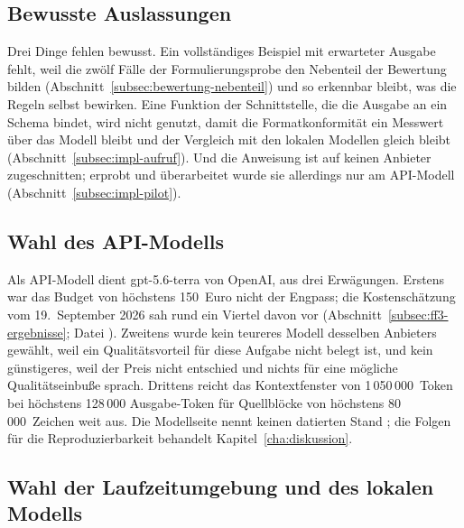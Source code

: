 \documentclass[11pt,a4paper]{report}
\begin{document}
\subsection{Bewusste Auslassungen}
\label{subsec:prompt-auslassungen}

Drei Dinge fehlen bewusst. Ein vollständiges Beispiel mit erwarteter
Ausgabe fehlt, weil die zwölf Fälle der Formulierungsprobe den
Nebenteil der Bewertung bilden (Abschnitt~\ref{subsec:bewertung-nebenteil})
und so erkennbar bleibt, was die Regeln selbst bewirken. Eine Funktion
der Schnittstelle, die die Ausgabe an ein Schema bindet, wird nicht
genutzt, damit die Formatkonformität ein Messwert über das Modell bleibt
und der Vergleich mit den lokalen Modellen gleich bleibt
(Abschnitt~\ref{subsec:impl-aufruf}). Und die Anweisung ist auf keinen
Anbieter zugeschnitten; erprobt und überarbeitet wurde sie allerdings
nur am API-Modell (Abschnitt~\ref{subsec:impl-pilot}).

\subsection{Wahl des API-Modells}
\label{subsec:modellwahl-api}

Als API-Modell dient gpt-5.6-terra von OpenAI, aus drei Erwägungen.
Erstens war das Budget von höchstens 150~Euro nicht der Engpass; die
Kostenschätzung vom 19.~September 2026 sah rund ein Viertel davon vor
(Abschnitt~\ref{subsec:ff3-ergebnisse};
Datei ). Zweitens wurde kein teureres
Modell desselben Anbieters gewählt, weil ein Qualitätsvorteil für diese
Aufgabe nicht belegt ist, und kein günstigeres, weil der Preis nicht
entschied und nichts für eine mögliche Qualitätseinbuße sprach.
Drittens reicht das Kontextfenster von 1\,050\,000~Token bei höchstens
128\,000 Ausgabe-Token \cite{openaiterra} für Quellblöcke von höchstens
80\,000~Zeichen weit aus. Die Modellseite nennt keinen datierten Stand
\cite{openaiterra}; die Folgen für die Reproduzierbarkeit behandelt
Kapitel~\ref{cha:diskussion}.

\subsection{Wahl der Laufzeitumgebung und des lokalen Modells}
\label{subsec:modellwahl-lokal}
\end{document}
